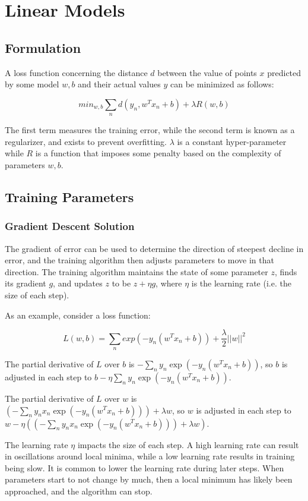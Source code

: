 \documentclass[12pt,titlepage]{article}
\let\stdsection\section
\renewcommand\section{\clearpage\stdsection}
\begin{document}
  \section{Linear Models}

    \subsection{Formulation}
      A loss function concerning the distance $d$ between the value of points $x$ predicted by some model $w, b$ and their actual values $y$ can be minimized as follows:

      $$min_{w,b} \sum_n d(y_n, w^Tx_n + b) + \lambda R(w, b)$$

      The first term measures the training error, while the second term is known as a regularizer, and exists to prevent overfitting. $\lambda$ is a constant hyper-parameter
      while $R$ is a function that imposes some penalty based on the complexity of parameters $w, b$.

    \subsection{Training Parameters}

      \subsubsection{Gradient Descent Solution}
      The gradient of error can be used to determine the direction of steepest decline in error, and the training algorithm then adjusts parameters to move in that direction.
      The training algorithm maintains the state of some parameter $z$, finds its gradient $g$, and updates $z$ to be $z + \eta g$, where $\eta$ is the learning rate (i.e. the
      size of each step).

      As an example, consider a loss function:

      $$L(w,b) = \sum_n exp(-y_n(w^Tx_n + b)) + \frac{\lambda}{2}||w||^2$$

      The partial derivative of $L$ over $b$ is $-\sum_n y_n \exp(-y_n(w^Tx_n + b))$, so $b$ is adjusted in each step to $b - \eta \sum_n y_n \exp(-y_n(w^Tx_n + b))$.

      The partial derivative of $L$ over $w$ is $(-\sum_n y_n x_n \exp(-y_n(w^Tx_n + b))) + \lambda w$, so $w$ is adjusted in each step to
      $w - \eta ((-\sum_n y_n x_n \exp(-y_n(w^Tx_n + b))) + \lambda w)$.

      The learning rate $\eta$ impacts the size of each step. A high learning rate can result in oscillations around local minima, while a low learning rate results in training
      being slow. It is common to lower the learning rate during later steps. When parameters start to not change by much, then a local minimum has likely been approached, and
      the algorithm can stop.
\end{document}
